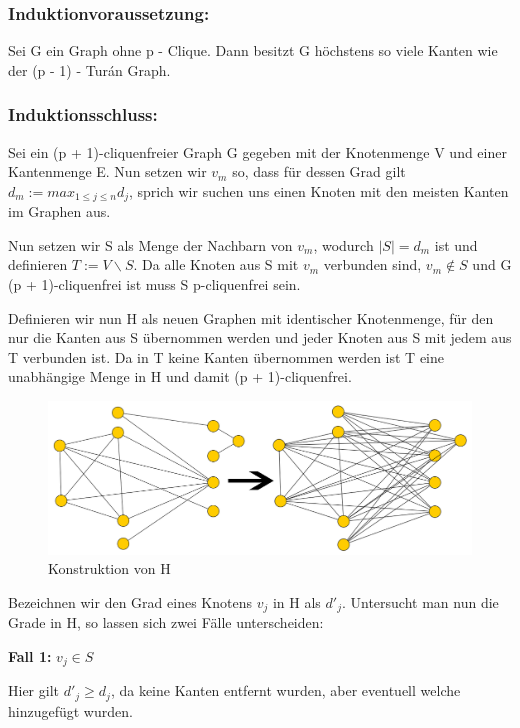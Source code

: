 \documentclass[12pt, a4paper]{article}
\begin{document}
\subsubsection{Induktionvoraussetzung:}

Sei G ein Graph ohne p - Clique. Dann besitzt G höchstens so viele Kanten wie der (p - 1) - Turán Graph.

\subsubsection{Induktionsschluss:}

Sei ein (p + 1)-cliquenfreier Graph G gegeben mit der Knotenmenge V und einer Kantenmenge E. Nun setzen wir $v_m$ so, dass für dessen Grad gilt $d_m := max_{1 \le j \le n} d_j$, sprich wir suchen uns einen Knoten mit den meisten Kanten im Graphen aus.

Nun setzen wir S als Menge der Nachbarn von $v_m$, wodurch $\mid S \mid = d_m$ ist und definieren $T := V \backslash S$. Da alle Knoten aus S mit $v_m$ verbunden sind, $v_m \notin S$ und G (p + 1)-cliquenfrei ist muss S p-cliquenfrei sein.

Definieren wir nun H als neuen Graphen mit identischer Knotenmenge, für den nur die Kanten aus S übernommen werden und jeder Knoten aus S mit jedem aus T verbunden ist. Da in T keine Kanten übernommen werden ist T eine unabhängige Menge in H und damit (p + 1)-cliquenfrei.

\begin{figure}[H] 
		\centering
		\includegraphics[page=1, width=\textwidth]{assets/proof2}
		\caption{Konstruktion von H} 
\end{figure}

Bezeichnen wir den Grad eines Knotens $v_j$ in H als $d'_j$. Untersucht man nun die Grade in H, so lassen sich zwei Fälle unterscheiden:

\textbf{Fall 1:} $v_j \in S$

Hier gilt $d'_j \ge d_j$, da keine Kanten entfernt wurden, aber eventuell welche hinzugefügt wurden.
\end{document}
